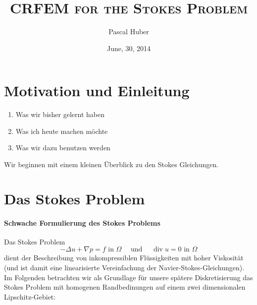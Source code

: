 \message{ !name(script.tex)}\documentclass[a4paper]{scrartcl}
\DeclareMathOperator{\divOp}{div}
\theoremstyle{plain}
\theoremstyle{definition}
\theoremstyle{remark}
\begin{document}

\title{\textsc{CRFEM for the Stokes Problem}}
\author{Pascal Huber}
\date{June, 30, 2014}
\maketitle

\section{Motivation und Einleitung}
\label{sec:motiv-und-einl}

{\color{red}
  \begin{enumerate}
  \item Was wir bisher gelernt haben
  \item Was ich heute machen möchte
  \item Was wir dazu benutzen werden
  \end{enumerate}
}

\noindent Wir beginnen mit einem kleinen Überblick zu den Stokes Gleichungen. 

\section{Das Stokes Problem}
\label{sec:das-stokes-problem}

\paragraph{Schwache Formulierung des Stokes Problems}
\label{sec:schw-form-des}

Das Stokes Problem 
\begin{equation}
  \label{eq:1}
  -\Delta u + \nabla p = f \text{ in } \Omega \quad \text{ und }
  \quad \divOp u = 0 \text{ in } \Omega
\end{equation}
dient der Beschreibung von inkompressiblen
Flüssigkeiten mit hoher Viskosität (und ist damit eine linearisierte
Vereinfachung der Navier-Stokes-Gleichungen).\\ 

\noindent Im Folgenden betrachten wir als Grundlage für unsere spätere
Diskretisierung das Stokes Problem mit homogenen Randbedinungen auf
einem zwei dimensionalen Lipschitz-Gebiet: 
\end{document}
